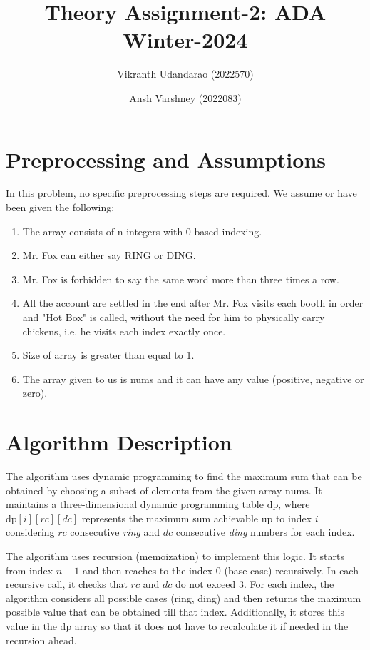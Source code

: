 \documentclass{article}
\title{Theory Assignment-2: ADA Winter-2024}
\author{Vikranth Udandarao (2022570) \and Ansh Varshney (2022083)}
\date{}
\begin{document}
\maketitle


\section{Preprocessing and Assumptions}
    In this problem, no specific preprocessing steps are required. We assume or have been given the following:

    \begin{enumerate}
        \item The array consists of n integers with 0-based indexing.
        \item Mr. Fox can either say RING or DING.
        \item Mr. Fox is forbidden to say the same word more than three times a row.
        \item All the account are settled in the end after Mr. Fox visits each booth in order and "Hot Box" is called, without the need for him to physically carry chickens, i.e. he visits each index exactly once.
        \item Size of array is greater than equal to 1.
        \item The array given to us is nums and it can have any value (positive, negative or zero).
    \end{enumerate}


\section{Algorithm Description}
    The algorithm uses dynamic programming to find the maximum sum that can be obtained by choosing a subset of elements from the given array $\text{nums}$. It maintains a three-dimensional dynamic programming table $\text{dp}$, where $\text{dp}[i][rc][dc]$ represents the maximum sum achievable up to index $i$ considering $rc$ consecutive \textit{ring} and $dc$ consecutive \textit{ding} numbers for each index.

    The algorithm uses recursion (memoization) to implement this logic. It starts from index $n-1$ and then reaches to the index $0$ (base case) recursively. In each recursive call, it checks that $rc$ and $dc$ do not exceed $3$. For each index, the algorithm considers all possible cases (ring, ding) and then returns the maximum possible value that can be obtained till that index. Additionally, it stores this value in the dp array so that it does not have to recalculate it if needed in the recursion ahead.
\end{document}
